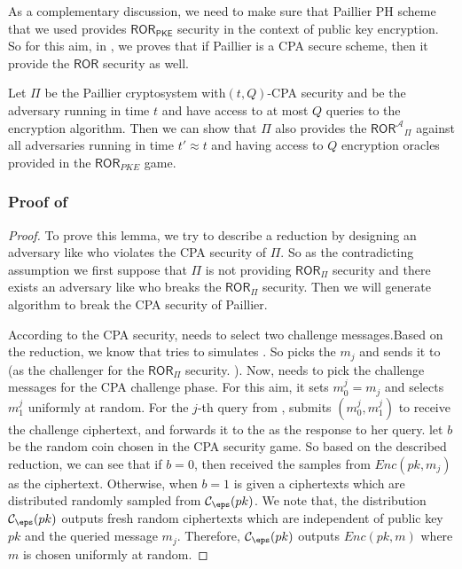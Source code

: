  As a complementary discussion, we need to make sure that Paillier PH scheme that we used provides  $ \mathsf{ROR}_{\mathsf{PKE}} $ security in the context of public key encryption. So for this aim, in , we proves that if Paillier is a CPA secure scheme, then it provide the $ \mathsf{ROR} $ security as well. 
 \begin{lemma}
 	Let $ \Pi $ be the Paillier cryptosystem with$ (t,Q) $-CPA security and \A be the adversary running in time $ t $ and have access to at most $ Q $ queries to the encryption algorithm. Then we can show that $ \Pi $ also provides the $ \mathsf{ROR^{\mathcal{A}}}_{\Pi} $ against all adversaries running in time $ t'\approx t $ and having access to $ Q $ encryption oracles provided in the $ \mathsf{ROR}_{PKE} $ game. 
 \end{lemma}
 
 \subsubsection{Proof of } 
 \begin{proof}
 	To prove this lemma, we try to describe a reduction by designing an adversary like \B who violates the CPA security of $ \Pi $. So as the contradicting assumption we first suppose that $ \Pi $ is not providing $ \mathsf{ROR}_{\Pi} $  security and there exists an adversary like \A who breaks the $ \mathsf{ROR}_{\Pi} $ security. Then we will generate algorithm \B to break the CPA security of Paillier. 
 	
 	According to the CPA security, \B needs to select two challenge messages.Based on the reduction, we know that \B tries to simulates \A. So \A picks the $ m_j $ and sends it to \B (as the challenger for the $ \mathsf{ROR}_{\Pi} $ security. ). Now, \B needs to pick the challenge messages for the CPA challenge phase. For this aim, it sets $ m^{j}_0 = m_j $ and selects $ m^j_1 $ uniformly at random. For the $ j $-th query from \A, \B submits $ (m^{j}_0, m^{j}_1) $ to receive the challenge ciphertext, and forwards it to the \B as the response to her query.  let $ b $ be the random coin chosen in the CPA security game. So based on the described reduction, we can see that if $ b=0 $, then \B received the samples from $ Enc(pk, m_j) $ as the ciphertext. Otherwise, when $ b=1 $ \B is given a ciphertexts which are distributed randomly sampled from $ \mathcal{C}_{\eps}(pk) $. We note that, the distribution $ \mathcal{C}_{\eps}(pk)  $ outputs fresh random ciphertexts which are independent of public key $ pk $ and the queried message $ m_j $. Therefore,  $ \mathcal{C}_{\eps}(pk) $ outputs $ Enc(pk, m) $ where  $ m $ is chosen uniformly at random.  
  \end{proof}
 
